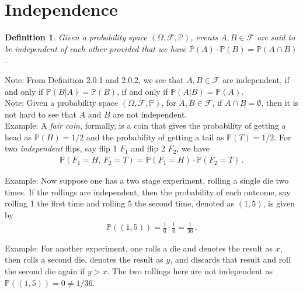 \documentclass[11pt, onesided]{book}
\theoremstyle{break}
\theoremstyle{break}
\newtheorem{defn}{Definition}[thm]
\newcommand{\note}{\color{red}Note: \color{black}}
\newcommand{\example}{\color{green}Example: \color{black}}
\begin{document}
\section[Independence]{\color{red}Independence \color{black}}
\begin{defn}
Given a probability space $(\Omega, \mathcal{F}, \mathbb{P})$, events $A,B \in \mathcal{F}$ are said to be independent of each other provided that we have $\mathbb{P}(A)\cdot \mathbb{P}(B) = \mathbb{P}(A\cap B)$. 
\end{defn}

\note From Definition 2.0.1 and 2.0.2, we see that $A,B \in \mathcal{F}$ are independent, if and only if $\mathbb{P}(B|A) = \mathbb{P}(B)$, if and only if $\mathbb{P}(A |B) = \mathbb{P}(A)$.\\

\note Given a probability space $(\Omega,\mathcal{F},\mathbb{P})$, for $A ,B \in \mathcal{F}$, if $A \cap B = \emptyset$, then it is not hard to see that $A$ and $B$ are not independent. \\

\example A \textit{fair coin}, formally, is a coin that gives the probability of getting a head as $\mathbb{P}(H) = 1/2$ and the probability of getting a tail as $\mathbb{P}(T) = 1/2$. For two \textit{independent} flips, say flip 1 $F_1$ and flip 2 $F_2$, we have
\begin{align*}
\mathbb{P}(F_1 = H,\, F_2 = T) = \mathbb{P}(F_1 = H) \cdot \mathbb{P}(F_2 = T)\,.
\end{align*}

\example Now suppose one has a two stage experiment, rolling a single die two times. If the rollings are independent, then the probability of each outcome, say rolling $1$ the first time and rolling $5$ the second time, denoted as $(1,5)$, is given by
\begin{align*}
\mathbb{P}((1,5)) = \frac{1}{6}\cdot \frac{1}{6} = \frac{1}{36}\, .
\end{align*}

\example For another experiment, one rolls a die and denotes the result as $x$, then rolls a second die, denotes the result as $y$, and discards that result and roll the second die again if $y>x$. The two rollings here are not independent as $\mathbb{P}((1,5)) = 0 \neq 1/36$. 
\end{document}

